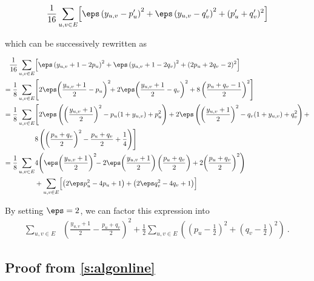 \begin{equation*}
  \frac{1}{16} \sum_{u,v \in E} \Bigl[ \eps\left(y_{u,v} - p_u'\right)^2 + \eps\left(y_{u,v} - q_v'\right)^2 + (p'_u+q_v')^2 \Bigr]
\end{equation*}

which can be successively rewritten as

\begin{align*}
  \frac{1}{16} \sum_{u,v \in E} & \Bigl[ \eps\left(y_{u,v}+1 - 2p_u\right)^2 + \eps\left(y_{u,v}+1 - 2q_v\right)^2
	+ (2p_u +2q_v -2)^2 \Bigr]
\\=
	\frac{1}{8} \sum_{u,v \in E} & \Biggl[ 2\eps\!\left(\frac{y_{u,v}+1}{2} - p_u\right)^2\!\! +  2\eps\!\left(\frac{y_{u,v}+1}{2} - q_v\right)^2
	+ 8\left(\frac{p_u +q_v -1}{2}\right)^2 \Biggr]
\\=
  \frac{1}{8}\sum_{u,v \in E} & \Biggl[ 2\eps\left(\left(\frac{y_{u,v}+1}{2}\right)^2 -
    p_u(1+y_{u,v}) + p_u^2\right) + %
                              2\eps\left(\left(\frac{y_{u,v}+1}{2}\right)^2 - q_v(1+y_{u,v}) + q_v^2\right) +  \\
                              & 8\left(\left(\frac{p_u +q_v}{2}\right)^2 - \frac{p_u+q_v}{2} + \frac{1}{4} \right) \Biggr]
\\=
  \frac{1}{8}\sum_{u,v \in E} & 4\Biggl(\eps\!\left(\frac{y_{u,v}+1}{2}\right)^2\!\! -
  2\eps\!\left(\frac{y_{u,v}+1}{2}\right)\left(\frac{p_u+q_v}{2}\right)
  + 2\!\left(\frac{p_u +q_v}{2}\right)^2\Biggr)
\\&+
  \sum_{u,v \in E} \Bigl[ \left(2\eps p_u^2 - 4p_u + 1\right) + \left(2\eps q_v^2 - 4q_v + 1\right) \Bigr]
\end{align*}

By setting $\eps=2$, we can factor this expression into 
\begin{align*}
  \sum_{u,v \in E} &\left(\frac{y_{u,v}+1}{2} - \frac{p_u+q_v}{2}\right)^2
  + \frac{1}{2}\sum_{u,v \in E} \left(\left(p_u - \frac{1}{2}\right )^2 + \left(q_v -
  \frac{1}{2}\right)^2 \right)~.
\end{align*}

\subsection{Proof from \autoref{s:algonline}}

